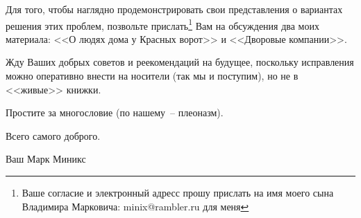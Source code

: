 \documentclass[utf8x, 12pt]{G7-32a} %
\begin{document}
Для того, чтобы наглядно продемонстрировать свои представления о вариантах решения этих проблем, позвольте прислать\footnote{Ваше согласие и электронный адресс прошу прислать на имя моего сына Владимира Марковича: minix@rambler.ru для меня} Вам на обсуждения два моих материала: <<О людях дома у Красных ворот>> и <<Дворовые компании>>.

Жду Ваших добрых советов и реекомендаций на будущее, поскольку исправления можно оперативно внести на носители (так мы и поступим), но не в <<живые>> книжки.

Простите за многословие (по нашему~-- плеоназм).

Всего самого доброго.
 
\indent
 
Ваш Марк Миникс
 
\mainmatter %



\backmatter %



\appendix   %
\end{document}
